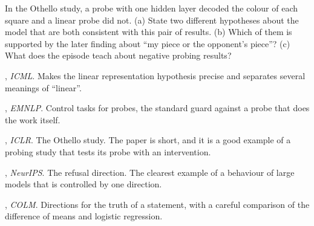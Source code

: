 \begin{exercise}\label{ex:othello}
In the Othello study, a probe with one hidden layer decoded the colour of each square and a linear probe did
not. (a) State two different hypotheses about the model that are both consistent with this pair of results.
(b) Which of them is supported by the later finding about ``my piece or the opponent's piece''? (c) What does
the episode teach about negative probing results?
\end{exercise}

\begin{readinglist}
\item \citet{park2024linear}, \emph{ICML}. Makes the linear representation hypothesis precise and separates
several meanings of ``linear''.
\item \citet{hewitt2019designing}, \emph{EMNLP}. Control tasks for probes, the standard guard against a probe that
does the work itself.
\item \citet{li2023emergent}, \emph{ICLR}. The Othello study. The paper is short, and it is a good example of a probing study that tests its probe
with an intervention.
\item \citet{arditi2024refusal}, \emph{NeurIPS}. The refusal direction. The clearest example of a behaviour of
large models that is controlled by one direction.
\item \citet{marks2024geometry}, \emph{COLM}. Directions for the truth of a statement, with a careful comparison of
the difference of means and logistic regression.
\end{readinglist}
